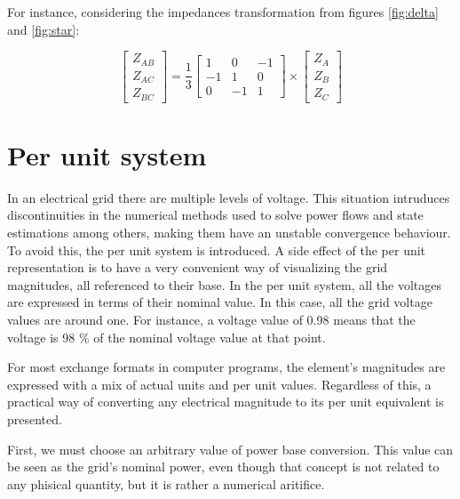\documentclass{tufte-book}
\begin{document}
For instance, considering the impedances transformation from figures \ref{fig:delta} and \ref{fig:star}:

\begin{equation}
\left[ \begin{array}{c}
Z_{AB} \\
Z_{AC} \\
Z_{BC}
\end{array} \right] = \frac{1}{3} \left[ \begin{array}{ccc}
1 & 0 & -1 \\
-1 & 1 & 0 \\
0 & -1 & 1
\end{array} \right] \times \left[ \begin{array}{c}
Z_A \\
Z_B \\
Z_C
\end{array} \right]
\end{equation}




\section{Per unit system}

In an electrical grid there are multiple levels of voltage. This situation intruduces discontinuities in the numerical methods used to solve power flows and state estimations among others, making them have an unstable convergence behaviour. To avoid this, the per unit system is introduced. A side effect of the per unit representation is to have a very convenient way of visualizing the grid magnitudes, all referenced to their base. In the per unit system, all the voltages are expressed in terms of their nominal value. In this case, all the grid voltage values are around one. For instance, a voltage value of 0.98 means that the voltage is 98 \% of the nominal voltage value at that point.

For most exchange formats in computer programs, the element's magnitudes are expressed with a mix of actual units and per unit values. Regardless of this, a practical way of converting any electrical magnitude to its per unit equivalent is presented.

First, we must choose an arbitrary value of power base conversion. This value can be seen as the grid's nominal power, even though that concept is not related to any phisical quantity, but it is rather a numerical aritifice. 

\end{document}
